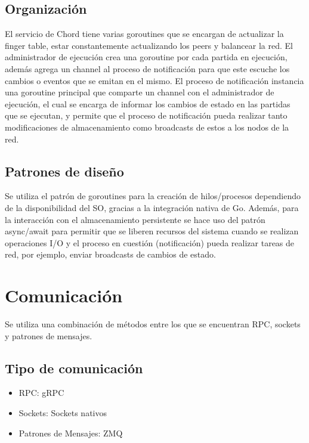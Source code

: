 \documentclass{article}
\begin{document}
\subsection{Organización}
El servicio de Chord tiene varias goroutines que se encargan de actualizar la finger table, estar constantemente actualizando los peers y balancear la red.
El administrador de ejecución crea una goroutine por cada partida en ejecución, además agrega un channel al proceso de notificación para que este escuche los cambios o eventos que se emitan en el mismo.
El proceso de notificación instancia una goroutine principal que comparte un channel con el administrador de ejecución, el cual se encarga de informar los cambios de estado en las partidas que se ejecutan, y permite que el proceso de notificación pueda realizar tanto modificaciones de almacenamiento como broadcasts de estos a los nodos de la red.

\subsection{Patrones de diseño}
Se utiliza el patrón de goroutines para la creación de hilos/procesos dependiendo de la disponibilidad del SO, gracias a la integración nativa de Go.
Además, para la interacción con el almacenamiento persistente se hace uso del patrón async/await para permitir que se liberen recursos del sistema cuando se realizan operaciones I/O y el proceso en cuestión (notificación) pueda realizar tareas de red, por ejemplo, enviar broadcasts de cambios de estado.

\section{Comunicación}
Se utiliza una combinación de métodos entre los que se encuentran RPC, sockets y patrones de mensajes.

\subsection{Tipo de comunicación}
\begin{itemize}
\item{RPC: gRPC}
\item{Sockets: Sockets nativos}
\item{Patrones de Mensajes: ZMQ}
\end{itemize}
\end{document}
